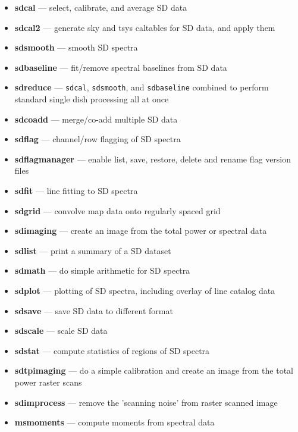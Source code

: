 \begin{itemize}
 
\item {\bf sdcal} --- select, calibrate, and average SD data

\item {\bf sdcal2} --- generate sky and tsys caltables for SD data, and apply them 

\item {\bf sdsmooth} --- smooth SD spectra

\item {\bf sdbaseline} --- fit/remove spectral baselines from SD data

\item {\bf sdreduce} --- {\tt sdcal}, {\tt sdsmooth}, and {\tt sdbaseline} combined to perform standard single dish processing all at once 

\item {\bf sdcoadd} --- merge/co-add multiple SD data

\item {\bf sdflag} --- channel/row flagging of SD spectra

\item {\bf sdflagmanager} --- enable list, save, restore, delete and rename flag version files

\item {\bf sdfit} --- line fitting to SD spectra

\item {\bf sdgrid} --- convolve map data onto regularly spaced grid

\item {\bf sdimaging} --- create an image from the total power or spectral data

\item {\bf sdlist} --- print a summary of a SD dataset

\item {\bf sdmath} --- do simple arithmetic for SD spectra 

\item {\bf sdplot} --- plotting of SD spectra, including overlay of line
catalog data

\item {\bf sdsave} --- save SD data to different format

\item {\bf sdscale} --- scale SD data
 
\item {\bf sdstat} --- compute statistics of regions of SD spectra

\item {\bf sdtpimaging} --- do a simple calibration and create an image from the total power raster scans

\item {\bf sdimprocess} --- remove the 'scanning noise' from raster scanned image  

\item {\bf msmoments} --- compute moments from spectral data

\end{itemize}


